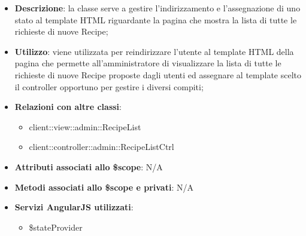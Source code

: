 			\begin{itemize}
				\item \textbf{Descrizione}: la classe serve a gestire l'indirizzamento e l'assegnazione di uno stato al template HTML riguardante la pagina che mostra la lista di tutte le richieste di nuove Recipe;
				\item \textbf{Utilizzo}: viene utilizzata per reindirizzare l'utente al template HTML della pagina che permette all'amministratore di visualizzare la lista di tutte le richieste di nuove Recipe proposte dagli utenti ed assegnare al template scelto il controller opportuno per gestire i diversi compiti;
				\item \textbf{Relazioni con altre classi}:
					\begin{itemize}
						\item client::view::admin::RecipeList
						\item client::controller::admin::RecipeListCtrl
					\end{itemize}
				\item \textbf{Attributi associati allo \$scope}: N/A
				\item \textbf{Metodi associati allo \$scope e privati}: N/A
				\item \textbf{Servizi AngularJS utilizzati}:
					\begin{itemize}
						\item \$stateProvider
					\end{itemize}
			\end{itemize}

